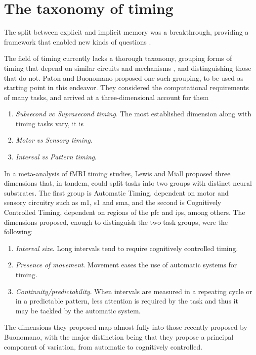 \section{The taxonomy of timing}
\label{sub:taxonomy}

    The split between explicit and implicit memory was a breakthrough, providing a framework that enabled new kinds of questions \cite{paton2018neural}. %
    
    
    The field of timing currently lacks a thorough taxonomy, grouping forms of timing that depend on similar circuits and mechanisms \cite{}, and distinguishing those that do not. Paton and Buonomano \cite{paton2018neural} proposed one such grouping, to be used as starting point in this endeavor. They considered the computational requirements of many tasks, and arrived at a three-dimensional account for them
    \begin{enumerate}
        \item \textit{Subsecond vc Suprasecond timing}. The most established dimension along with timing tasks vary, it is
        \item \textit{Motor vs Sensory timing}.
        \item \textit{Interval vs Pattern timing}.
    \end{enumerate}
    

    In a meta-analysis of fMRI timing studies, Lewis and Miall \cite{lewis2003distinct} proposed three dimensions that, in tandem, could split tasks into two groups with distinct neural substrates. The first group is Automatic Timing, dependent on motor and sensory circuitry such as \ac{m1}, \ac{s1} and \ac{sma}, and the second is Cognitively Controlled Timing, dependent on regions of the \ac{pfc} and \ac{ips}, among others. The dimensions proposed, enough to distinguish the two task groups, were the following:
    \begin{enumerate}
        \item \textit{Interval size}. Long intervals tend to require cognitively controlled timing.
        \item \textit{Presence of movement}. Movement eases the use of automatic systems for timing.
        \item \textit{Continuity/predictability}. When intervals are measured in a repeating cycle or in a predictable pattern, less            attention is required by the task and thus it may be tackled by the automatic system.
    \end{enumerate}
    The dimensions they proposed map almost fully into those recently proposed by Buonomano, with the major distinction being that they propose a principal component of variation, from automatic to cognitively controlled. 
    
